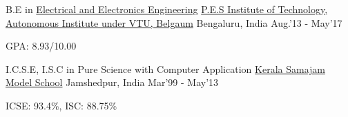 \begin{cventries}
	\cventry
	{\large B.E in \href{https://eee.pes.edu/}{\large Electrical and Electronics Engineering}}
	{\href{https://pesit.pes.edu/}{\large P.E.S Institute of Technology, Autonomous Institute under VTU, Belgaum}}
	{\large Bengaluru, India}
	{\large Aug.'13 - May'17}
	{
		\begin{cvitems}
		\item{\large GPA: 8.93/10.00}
		\end{cvitems}
	}
\end{cventries}
\begin{cventries}
	\cventry
	{\large I.C.S.E, I.S.C in {\large Pure Science with Computer Application}}
	{\href{https://ksms.ac.in/}{\large Kerala Samajam Model School}}
	{\large Jamshedpur, India}
	{\large Mar'99 - May'13}
	{
		\begin{cvitems}
		\item{\large ICSE: 93.4\%, ISC: 88.75\%}
		\end{cvitems}
	}
\end{cventries}

